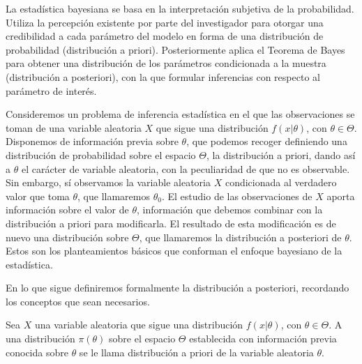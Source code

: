 La estadística bayesiana se basa en la interpretación subjetiva de la probabilidad. Utiliza la percepción existente por parte del investigador para otorgar una credibilidad a cada parámetro del modelo en forma de una distribución de probabilidad (distribución a priori). Posteriormente aplica el Teorema de Bayes para obtener una distribución de los parámetros condicionada a la muestra (distribución a posteriori), con la que formular inferencias con respecto al parámetro de interés.

Consideremos un problema de inferencia estadística en el que las observaciones se toman de una variable aleatoria $X$ que sigue una distribución $f(x|\theta)$, con $\theta\in\Theta$. Disponemos de información previa sobre $\theta$, que podemos recoger definiendo una distribución de probabilidad sobre el espacio $\Theta$, la distribución a priori, dando así a $\theta$ el carácter de variable aleatoria, con la peculiaridad de que no es observable. Sin embargo, sí observamos la variable aleatoria $X$ condicionada al verdadero valor que toma $\theta$, que llamaremos $\theta_0$. El estudio de las observaciones de $X$ aporta información sobre el valor de $\theta$, información que debemos combinar con la distribución a priori para modificarla. El resultado de esta modificación es de nuevo una distribución sobre $\Theta$, que llamaremos la distribución a posteriori de $\theta$. Estos son los planteamientos básicos que conforman el enfoque bayesiano de la estadística.

En lo que sigue definiremos formalmente la distribución a posteriori, recordando los conceptos que sean necesarios.

\begin{definition}
	Sea $X$ una variable aleatoria que sigue una distribución $f(x|\theta)$, con $\theta \in \Theta$. A una distribución $\pi(\theta)$ sobre el espacio $\Theta $ establecida con información previa conocida sobre $\theta$ se le llama distribución a priori de la variable aleatoria $\theta$.
\end{definition}


